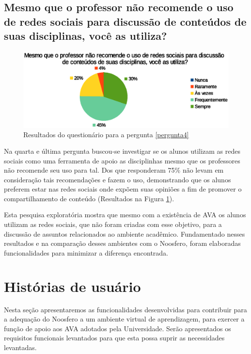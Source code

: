 \subsection*{Mesmo que o professor não recomende o uso de redes sociais para discussão de conteúdos de suas disciplinas, você as utiliza?}
\begin{figure}[h]
    \centering
    \includegraphics[keepaspectratio=true,scale=1]
      {figuras/pergunta4p.eps}
    \caption{Resultados do questionário para a pergunta \ref{pergunta4}}
    \label{fig:pergunta4}
\end{figure}

Na quarta e última pergunta buscou-se investigar se os alunos utilizam as redes sociais como uma ferramenta de apoio as disciplinhas mesmo que os professores não recomende seu uso para tal. Dos que responderam 75\% não levam em consideração tais recomendações e fazem o uso, demonstrando que os alunos preferem estar nas redes sociais onde expõem suas opiniões a fim de promover o compartilhamento de conteúdo (Resultados na Figura \ref{fig:pergunta4}).

Esta pesquisa exploratória mostra que mesmo com a existência de AVA os alunos utilizam as redes sociais, que não foram criadas com esse objetivo, para a discussão de assuntos relacionados ao ambiente acadêmico. Fundamentado nesses resultados e na comparação desses ambientes com o Noosfero, foram elaboradas funcionalidades para minimizar a diferença encontrada.

\section{Histórias de usuário}
\label{historia-usuario}

Nesta seção apresentaremos as funcionalidades desenvolvidas para contribuir para a adequação do Noosfero a um ambiente virtual de aprendizagem, para exercer a função de apoio aos AVA adotados pela Universidade. Serão apresentados os requisitos funcionais levantados para que esta possa suprir as necessidades levantadas.

